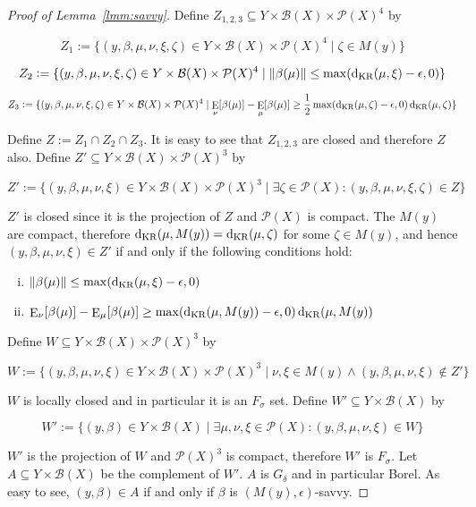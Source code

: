 \documentclass[11pt]{article}
\theoremstyle{definition}
\theoremstyle{plain}
\newcommand{\N}[1]{\lVert #1 \rVert}
\DeclareMathOperator{\E}{E}
\newcommand{\PM}{\mathcal{P}}
\newcommand{\DKR}{\operatorname{d}_{\textnormal{KR}}}
\newcommand{\Gm}{\mathcal{B}}
\begin{document}
\begin{proof}[Proof of Lemma~\ref{lmm:savvy}]

Define $Z_{1,2,3} \subseteq Y \times \Gm(X) \times \PM(X)^4$ by

$$Z_1:=\{(y,\beta,\mu,\nu,\xi,\zeta) \in Y \times \Gm(X) \times \PM(X)^4 \mid \zeta \in M(y)\}$$

$$Z_2:=\{(y,\beta,\mu,\nu,\xi,\zeta) \in Y \times \Gm(X) \times \PM(X)^4 \mid \N{\beta(\mu)} \leq \max(\DKR(\mu,\xi) - \epsilon, 0)\}$$

$$Z_3:=\{(y,\beta,\mu,\nu,\xi,\zeta) \in Y \times \Gm(X) \times \PM(X)^4 \mid \E_\nu[\beta(\mu)] - \E_\mu[\beta(\mu)] \geq \frac{1}{2}\max(\DKR(\mu,\zeta) - \epsilon, 0) \DKR(\mu,\zeta)\}$$

Define $Z := Z_1 \cap Z_2 \cap Z_3$. It is easy to see that $Z_{1,2,3}$ are closed and therefore $Z$ also. Define $Z' \subseteq Y \times \Gm(X) \times \PM(X)^3$ by

$$Z':=\{(y,\beta,\mu,\nu,\xi) \in Y \times \Gm(X) \times \PM(X)^3 \mid \exists \zeta \in \PM(X): (y,\beta,\mu,\nu,\xi,\zeta) \in Z\}$$

$Z'$ is closed since it is the projection of $Z$ and $\PM(X)$ is compact. The $M(y)$ are compact, therefore $\DKR(\mu,M(y))=\DKR(\mu,\zeta)$ for some $\zeta \in M(y)$, and hence $(y,\beta,\mu,\nu,\xi) \in Z'$ if and only if the following conditions hold:

\begin{enumerate}[i.]

\item $\N{\beta(\mu)} \leq \max(\DKR(\mu,\xi) - \epsilon, 0)$
\item $\E_\nu[\beta(\mu)] - \E_\mu[\beta(\mu)] \geq \max(\DKR(\mu,M(y)) - \epsilon, 0) \DKR(\mu,M(y))$

\end{enumerate}

Define $W \subseteq Y \times \Gm(X) \times \PM(X)^3$ by

$$W:=\{(y,\beta,\mu,\nu,\xi) \in Y \times \Gm(X) \times \PM(X)^3 \mid \nu,\xi \in M(y) \land (y,\beta,\mu,\nu,\xi) \not\in Z'\}$$

$W$ is locally closed and in particular it is an $F_\sigma$ set. Define $W' \subseteq Y \times \Gm(X)$ by

$$W':=\{(y,\beta) \in Y \times \Gm(X) \mid \exists \mu,\nu,\xi \in \PM(X): (y,\beta,\mu,\nu,\xi) \in W\}$$

$W'$ is the projection of $W$ and $\PM(X)^3$ is compact, therefore $W'$ is $F_\sigma$. Let $A \subseteq Y \times \Gm(X)$ be the complement of $W'$. $A$ is $G_\delta$ and in particular Borel. As easy to see, $(y,\beta) \in A$ if and only if $\beta$ is $(M(y),\epsilon)$-savvy.


\end{proof}
\end{document}
